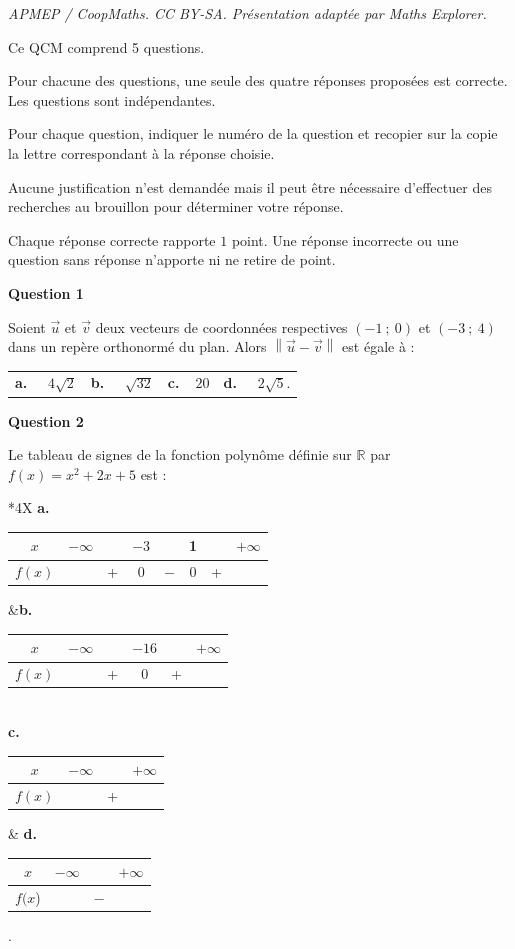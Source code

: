 \documentclass[10pt]{article}
\providecommand{\vv}[1]{\overrightarrow{#1}}
\providecommand{\R}{\mathbb{R}}
\providecommand{\vv}[1]{{\overrightarrow{#1}}}
\begin{document}
\noindent\textit{APMEP / CoopMaths. CC BY-SA. Présentation adaptée par Maths Explorer.}\par\medskip
\medskip
Ce QCM comprend 5 questions.

Pour chacune des questions, une seule des quatre réponses proposées est correcte. Les
questions sont indépendantes.

Pour chaque question, indiquer le numéro de la question et recopier sur la copie la lettre
correspondant à la réponse choisie.

Aucune justification n'est demandée mais il peut être nécessaire d'effectuer des recherches
au brouillon pour déterminer votre réponse.

Chaque réponse correcte rapporte $1$ point. Une réponse incorrecte ou une question sans
réponse n'apporte ni ne retire de point.

\medskip
\textbf{Question 1}
\medskip 


Soient $\vv{u}$ et $\vv{v}$ deux vecteurs de coordonnées respectives $(-1~;~0)$ et $(-3~;~4)$ dans un repère orthonormé du plan. Alors $ \left\|\vv{u}-\vv{v}\right\|$ est égale à :

\medskip

\begin{tabularx}{\linewidth}{*{4}{X}}
\textbf{a.~~} $4\sqrt{2} $ &\textbf{b.~~} $\sqrt{32} $&\textbf{c.~~}$20 $& \textbf{d.~~} $2\sqrt{5}  $.
\end{tabularx}

\medskip
\textbf{Question 2}
\medskip 

Le tableau de signes de la fonction polynôme définie sur $\R$ par $f(x) = x^2 + 2x + 5$ est :

\medskip

\begin{tabularx}{\linewidth}{*{4}{X}}
\textbf{a.~~} \begin{tabular}[]{|c|lcccccr|}
\hline
$x$ &$-\infty$& &$-3$& &1& &$+\infty$\\
\hline
$f(x)$& &+ &0& $-$ &0 &+&\\\hline
\end{tabular} &\textbf{b.~~}
\begin{tabular}[]{|c|lcccr|}\hline
$x$& $-\infty$& &$- 16$& &$+\infty$\\\hline
$f(x)$&        &+& 0  & + & \\\hline
\end{tabular}\\[1.2cm]

\textbf{c.~~}
\begin{tabular}[]{|c|l m{1.2cm}r|}
\hline
 $x$& $-\infty$& &$+\infty$\\\hline
$f(x)$&& \centering +&\\\hline
\end{tabular}
& \textbf{d.~~} 
\begin{tabular}[]{|c|l m{1.2cm}r|}
\hline
 $x$& $-\infty$& &$+\infty$\\\hline
$f(x$)&& \centering $-$&\\\hline
\end{tabular}.
\end{tabularx}
\end{document}
